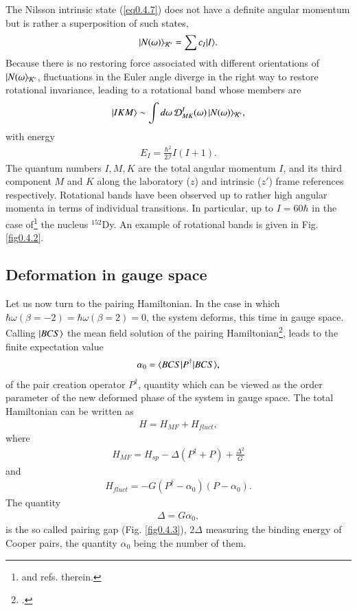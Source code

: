 The Nilsson intrinsic state (\ref{eq0.4.7}) does not have a definite angular momentum but is rather a superposition of such states,
\begin{align}\label{eq0.4.11}
|{N(\omega)} \rangle_{\mathcal K'}=\sum c_I|{I} \rangle.
\end{align}
Because there is no restoring force associated with different orientations of $|{N(\omega} \rangle_{\mathcal K'}$, fluctuations in the Euler angle diverge in the right way to restore rotational invariance, leading to a rotational band whose members are 
\begin{align}\label{eq0.1.47}
|{IKM} \rangle\sim\int d\omega \,\mathcal D^I_{MK}(\omega)\,|{N(\omega)} \rangle_{\mathcal K'},
\end{align}
with energy
\begin{align}\label{eq0.1.48}
E_I=\frac{\hbar^2}{2\mathcal I}I(I+1).
\end{align}
The quantum numbers $I,M,K$ are the total angular momentum $I$, and its third component $M$ and $K$ along the laboratory ($z$) and intrinsic ($z'$) frame references respectively.
Rotational bands have been observed up to rather high angular momenta in terms of individual transitions. In particular, up to $I=60\hbar$ in the case of\footnote{\cite{Nolan:88} and refs. therein.} the nucleus $^{152}$Dy. An example of rotational bands  is given in Fig. \ref{fig0.4.2}. 
\subsection{Deformation in gauge space}\label{S1.4.2}
Let us now turn to the pairing Hamiltonian. In the case in which \mbox{$\hbar\omega(\beta=-2)=\hbar\omega(\beta=2)=0$}, the system deforms, this time in gauge space. Calling $|{BCS} \rangle$ the  mean field solution of the pairing Hamiltonian\footnote{\cite{Bardeen:57a,Bardeen:57b}.}, leads to the finite expectation value
\begin{align}\label{eq0.4.14}
\alpha_0=\langle {BCS|P^\dagger|BCS} \rangle,
 \end{align}
   of the pair creation operator $P^\dagger$, quantity which can be viewed as the order parameter of the new deformed  phase of the system in gauge space. The total Hamiltonian can be written as
\begin{align}\label{eq0.1.50}
H=H_{MF}+H_{fluct},
\end{align}
where 
\begin{align}\label{eq0.1.51}
H_{MF}=H_{sp}-\Delta(P^\dagger+P)+\frac{\Delta^2}{G}
\end{align}
and
\begin{align}\label{eq0.1.52}
H_{fluct}=-G(P^\dagger-\alpha_0)(P-\alpha_0).
\end{align}
The quantity 
\begin{align}\label{eq0.1.53}
\Delta=G\alpha_0,
\end{align}
is the so called pairing gap (Fig. \ref{fig0.4.3}), $2\Delta$ measuring the binding energy of Cooper pairs, the quantity $\alpha_0$ being the number of them.

